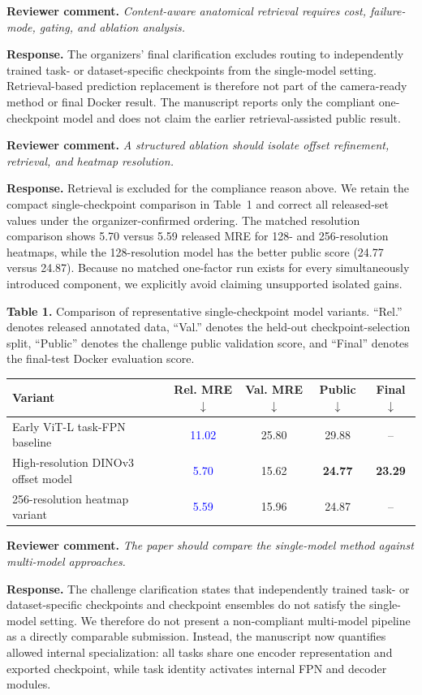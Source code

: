 \documentclass[11pt]{article}
\newcommand{\reviewcomment}[1]{\par\noindent\textbf{Reviewer comment.} \emph{#1}\par}
\newcommand{\response}[1]{\par\noindent\textbf{Response.} #1\par}
\begin{document}
\reviewcomment{Content-aware anatomical retrieval requires cost, failure-mode, gating, and ablation analysis.}
\response{The organizers' final clarification excludes routing to independently trained task- or dataset-specific checkpoints from the single-model setting. Retrieval-based prediction replacement is therefore not part of the camera-ready method or final Docker result. The manuscript reports only the compliant one-checkpoint model and does not claim the earlier retrieval-assisted public result.}

\reviewcomment{A structured ablation should isolate offset refinement, retrieval, and heatmap resolution.}
\response{Retrieval is excluded for the compliance reason above. We retain the compact single-checkpoint comparison in Table~1 and correct all released-set values under the organizer-confirmed ordering. The matched resolution comparison shows 5.70 versus 5.59 released MRE for 128- and 256-resolution heatmaps, while the 128-resolution model has the better public score (24.77 versus 24.87). Because no matched one-factor run exists for every simultaneously introduced component, we explicitly avoid claiming unsupported isolated gains.}

\begin{center}
\small
\textbf{Table 1.} Comparison of representative single-checkpoint model variants. ``Rel.'' denotes released annotated data, ``Val.'' denotes the held-out checkpoint-selection split, ``Public'' denotes the challenge public validation score, and ``Final'' denotes the final-test Docker evaluation score.

\vspace{0.4em}
\setlength{\tabcolsep}{3pt}
\begin{tabular}{lcccc}
\toprule
Variant & Rel. MRE$\downarrow$ & Val. MRE$\downarrow$ & Public$\downarrow$ & Final$\downarrow$ \\
\midrule
Early ViT-L task-FPN baseline & \textcolor{blue}{11.02} & 25.80 & 29.88 & -- \\
High-resolution DINOv3 offset model & \textcolor{blue}{5.70} & 15.62 & \textbf{24.77} & \textbf{23.29} \\
256-resolution heatmap variant & \textcolor{blue}{5.59} & 15.96 & 24.87 & -- \\
\bottomrule
\end{tabular}
\end{center}

\reviewcomment{The paper should compare the single-model method against multi-model approaches.}
\response{The challenge clarification states that independently trained task- or dataset-specific checkpoints and checkpoint ensembles do not satisfy the single-model setting. We therefore do not present a non-compliant multi-model pipeline as a directly comparable submission. Instead, the manuscript now quantifies allowed internal specialization: all tasks share one encoder representation and exported checkpoint, while task identity activates internal FPN and decoder modules.}
\end{document}
